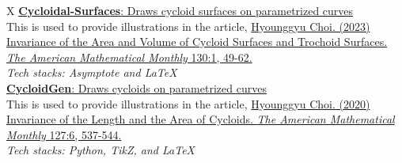 \documentclass[a4paper,10pt]{memoir}
\begin{document}
\begin{tblr}{X}
  \href{https://github.com/Zeta611/cycloidal-surfaces}{\textbf{Cycloidal-Surfaces}: Draws cycloid surfaces on parametrized curves}                                                                                                                                                             \\
  This is used to provide illustrations in the article, \href{https://www.tandfonline.com/doi/abs/10.1080/00029890.2022.2130677}{Hyounggyu Choi. (2023) Invariance of the Area and Volume of Cycloid Surfaces and Trochoid Surfaces. \textit{The American Mathematical Monthly} 130:1, 49-62.} \\
  \textit{Tech stacks: Asymptote and \LaTeX}                                                                                                                                                                                                                                                   \\[0.5\onelineskip]

  \href{https://github.com/Zeta611/CycloidGen}{\textbf{CycloidGen}: Draws cycloids on parametrized curves}                                                                                                                                                                                     \\
  This is used to provide illustrations in the article, \href{https://www.tandfonline.com/doi/abs/10.1080/00029890.2020.1743611}{Hyounggyu Choi. (2020) Invariance of the Length and the Area of Cycloids. \textit{The American Mathematical Monthly} 127:6, 537-544.}                         \\
  \textit{Tech stacks: Python, Ti\textit{k}Z, and \LaTeX}                                                                                                                                                                                                                                      \\[0.5\onelineskip]
\end{tblr}
\end{document}
